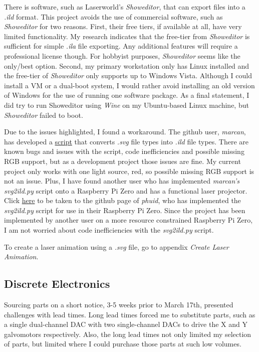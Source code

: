 \documentclass[journal]{IEEEtran}
\begin{document}
    There is software, such as Laserworld's \emph{Showeditor}, that can export files into a \emph{.ild} format.
    This project avoids the use of commercial software, such as \emph{Showeditor} for two reasons.
    First, their free tiers, if available at all, have very limited functionality.
    My research indicates that the free-tier from \emph{Showeditor} is sufficient for simple \emph{.ila} file exporting. 
    Any additional features will require a professional license though.
    For hobbyist purposes, \emph{Showeditor} seems like the only/best option.
    Second, my primary workstation only has Linux installed and the free-tier of \emph{Showeditor} only supports up to Windows Vista.
    Although I could install a VM or a dual-boot system, I would rather avoid installing an old version of Windows for the use of running one software package.
    As a final statement, I did try to run Showeditor using \emph{Wine} on my Ubuntu-based Linux machine, but \emph{Showeditor} failed to boot.

    Due to the issues highlighted, I found a workaround. 
    The github user, \emph{marcan}, has developed a {\href{https://github.com/marcan/openlase/blob/master/tools/svg2ild.py}{script}} that converts \emph{.svg} file types into \emph{.ild} file types.
    There are known bugs and issues with the script, code inefficiencies and possible missing RGB support, but as a development project those issues are fine. 
    My current project only works with one light source, red, so possible missing RGB support is not an issue.
    Plus, I have found another user who has implemented \emph{marcan's svg2ild.py} script onto a Raspberry Pi Zero and has a functional laser projector.
    Click {\href{https://github.com/phuid/laser_projector?tab=readme-ov-file#hw}{here}} to be taken to the github page of \emph{phuid}, who has implemented the \emph{svg2ild.py} script for use in their Raspberry Pi Zero.
    Since the project has been implemented by another user on a more resource constrained Raspberry Pi Zero, I am not worried about code inefficiencies with the \emph{svg2ild.py} script.

    To create a laser animation using a \emph{.svg} file, go to appendix \emph{Create Laser Animation}.

    \subsection{Discrete Electronics}
    Sourcing parts on a short notice, 3-5 weeks prior to March 17th, presented challenges with lead times.
    Long lead times forced me to substitute parts, such as a single dual-channel DAC with two single-channel DACs to drive the X and Y galvomotors respectively.
    Also, the long lead times not only limited my selection of parts, but limited where I could purchase those parts at such low volumes.
\end{document}
